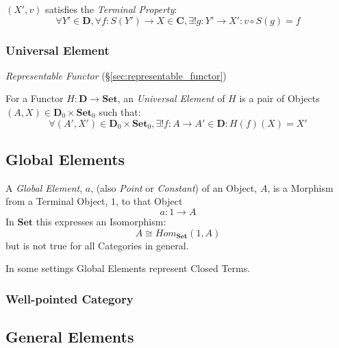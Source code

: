 $(X',v)$ satisfies the \emph{Terminal Property}:
\[
  \forall Y' \in \mathbf{D}, \forall f : S(Y') \rightarrow X \in
  \mathbf{C}, \exists! g : Y' \rightarrow X' : v \circ S(g) = f
\]




\subsubsection{Universal Element}\label{sec:universal_element}

\emph{Representable Functor} (\S\ref{sec:representable_functor})

For a Functor $H : \mathbf{D} \rightarrow \mathbf{Set}$, an
\emph{Universal Element} of $H$ is a pair of Objects $(A,X) \in
\mathbf{D}_0 \times \mathbf{Set}_0$ such that:
\[
  \forall (A',X') \in \mathbf{D}_0 \times \mathbf{Set}_0,
  \exists! f : A \rightarrow A' \in \mathbf{D} : H(f)(X) = X'
\]



\subsection{Global Elements}\label{sec:global_element}

A \emph{Global Element}, $a$, (also \emph{Point} or \emph{Constant})
of an Object, $A$, is a Morphism from a Terminal Object, $1$, to that
Object
\[
  a: 1 \rightarrow A
\]
In $\mathbf{Set}$ this expresses an Isomorphism:
\[
  A \cong Hom_\mathbf{Set}(1,A)
\]
but is not true for all Categories in general.

In some settings Global Elements represent Closed Terms.



\subsubsection{Well-pointed Category}\label{sec:well_pointed}



\subsection{General Elements}\label{sec:general_element}

